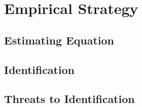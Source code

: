 \section{Empirical Strategy}
\label{sec:strategy}

\subsection{Estimating Equation}

\subsection{Identification}

\subsection{Threats to Identification}
